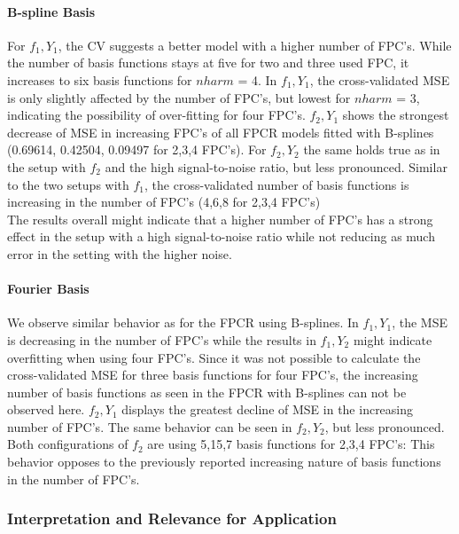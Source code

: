 \documentclass[11pt,twoside,a4paper]{article}
\begin{document}
	\paragraph{B-spline Basis}
	For $f_1,Y_1$, the CV suggests a better model with a higher number of FPC's. While the number of basis functions stays at five for two and three used FPC, it increases to six basis functions for $nharm$ = 4. In $f_1,Y_1$, the cross-validated MSE is only slightly affected by the number of FPC's, but lowest for $nharm$ = 3, indicating the possibility of over-fitting for four FPC's. $f_2,Y_1$ shows the strongest decrease of MSE in increasing FPC's of all FPCR models fitted with B-splines (0.69614, 0.42504, 0.09497 for 2,3,4 FPC's). For $f_2,Y_2$ the same holds true as in the setup with $f_2$ and the high signal-to-noise ratio, but less pronounced. Similar to the two setups with $f_1$, the cross-validated number of basis functions is increasing in the number of FPC's (4,6,8 for 2,3,4 FPC's)\\
	The results overall might indicate that a higher number of FPC's has a strong effect in the setup with a high signal-to-noise ratio while not reducing as much error in the setting with the higher noise.
	
	\paragraph{Fourier Basis}
	We observe similar behavior as for the FPCR using B-splines. In $f_1,Y_1$, the MSE is decreasing in the number of FPC's while the results in $f_1,Y_2$ might indicate overfitting when using four FPC's. Since it was not possible to calculate the cross-validated MSE for three basis functions for four FPC's, the increasing number of basis functions as seen in the FPCR with B-splines can not be observed here. $f_2,Y_1$ displays the greatest decline of MSE in the increasing number of FPC's. The same behavior can be seen in $f_2,Y_2$, but less pronounced. Both configurations of $f_2$ are using 5,15,7 basis functions for 2,3,4 FPC's: This behavior opposes to the previously reported increasing nature of basis functions in the number of FPC's.
	
	\subsubsection{Interpretation and Relevance for Application}
	
\end{document}
